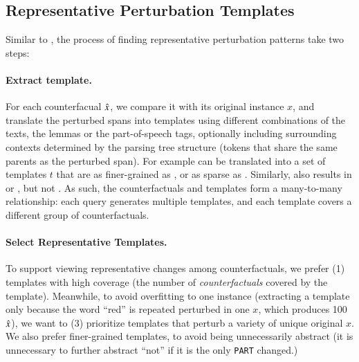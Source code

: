 \subsection{Representative Perturbation Templates}
\label{appendix:err_analysis_template}

Similar to \citet{wu2020tempura}, the process of finding representative perturbation patterns take two steps:

\paragraph{Extract template.}
For each counterfacual $\hat{x}$, we compare it with its original instance $x$, and translate the perturbed spans into templates using different combinations of the texts, the lemmas or the part-of-speech tags, optionally including surrounding contexts determined by the parsing tree structure (tokens that share the same parents as the perturbed span). 
For example  can be translated into a set of templates $t$ that are as finer-grained as , or as sparse as .
Similarly,  also results in  or , but not .
As such, the counterfactuals and templates form a many-to-many relationship: each query generates multiple templates, and each template covers a different group of counterfactuals.

\paragraph{Select Representative Templates.}
To support viewing representative changes among counterfactuals, we prefer (1) templates with high coverage (the number of
\emph{counterfactuals} covered by the template).
Meanwhile, to avoid overfitting to one instance (\eg extracting a template  only because the word ``red'' is repeated perturbed in one $x$, which produces 100 $\hat{x}$), we want to (3) prioritize templates that perturb a variety of unique original $x$.
We also prefer finer-grained templates, to avoid being unnecessarily abstract (\eg it is unnecessary to further abstract ``not'' if it is the only \texttt{PART} changed.)


